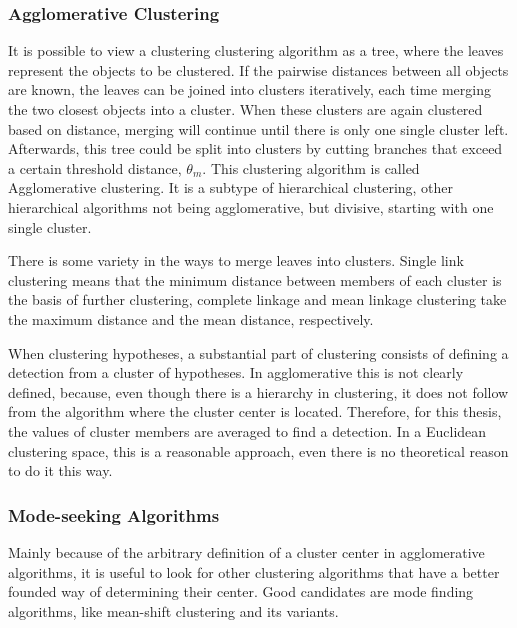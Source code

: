\subsubsection{Agglomerative Clustering} %
\label{sub:agglomerative_clustering}
It is possible to view a clustering clustering algorithm as a tree, where the leaves represent the objects to be clustered. If the pairwise distances between all objects are known, the leaves can be joined into clusters iteratively, each time merging the two closest objects into a cluster. When these clusters are again clustered based on distance, merging will continue until there is only one single cluster left. Afterwards, this tree could be split into clusters by cutting branches that exceed a certain threshold distance, $\theta_m$. This clustering algorithm is called Agglomerative clustering. It is a subtype of hierarchical clustering, other hierarchical algorithms not being agglomerative, but divisive, starting with one single cluster.

There is some variety in the ways to merge leaves into clusters. Single link clustering means that the minimum distance between members of each cluster is the basis of further clustering, complete linkage and mean linkage clustering take the maximum distance and the mean distance, respectively.

When clustering hypotheses, a substantial part of clustering consists of defining a detection from a cluster of hypotheses. In agglomerative this is not clearly defined, because, even though there is a hierarchy in clustering, it does not follow from the algorithm where the cluster center is located. Therefore, for this thesis, the values of cluster members are averaged to find a detection. \cite{becker2012codebook} In a Euclidean clustering space, this is a reasonable approach, even there is no theoretical reason to do it this way.


\subsubsection{Mode-seeking Algorithms} %
\label{sub:mode_finding_algorithms}

Mainly because of the arbitrary definition of a cluster center in agglomerative algorithms, it is useful to look for other clustering algorithms that have a better founded way of determining their center. Good candidates are mode finding algorithms, like mean-shift clustering and its variants. \cite{cheng1995mean,vedaldi2008quick}

